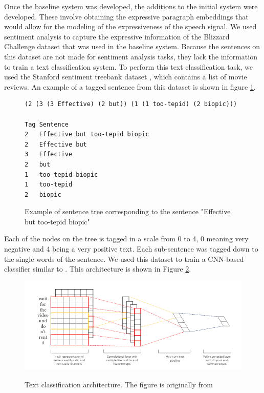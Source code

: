 Once the baseline system was developed, the additions to the initial system were developed. These involve obtaining the expressive paragraph embeddings that would allow for the modeling of the expressiveness of the speech signal. We used sentiment analysis to capture the expressive information of the Blizzard Challenge dataset that was used in the baseline system. Because the sentences on this dataset are not made for sentiment analysis tasks, they lack the information to train a text classification system. To perform this text classification task, we used the Stanford sentiment treebank dataset \cite{socher2013recursive}, which contains a list of movie reviews. An example of a tagged sentence from this dataset is shown in figure \ref{fig:tree}.

\begin{figure}[h]
    \begin{lstlisting}[basicstyle=\small,frame=single]
(2 (3 (3 Effective) (2 but)) (1 (1 too-tepid) (2 biopic)))

Tag Sentence
2   Effective but too-tepid biopic
2   Effective but
3   Effective
2   but
1   too-tepid biopic
1   too-tepid
2   biopic
    \end{lstlisting}
    \label{fig:tree}
    \caption{Example of sentence tree corresponding to the sentence "Effective but too-tepid biopic"}
\end{figure}

Each of the nodes on the tree is tagged in a scale from 0 to 4, 0 meaning very negative and 4 being a very positive text. Each sub-sentence was tagged down to the single words of the sentence. We used this dataset to train a CNN-based classifier similar to \cite{DBLP:journals/corr/Kim14f}. This architecture is shown in Figure \ref{fig:cnn-sa}.

\begin{figure}[h]
    \centering
    \includegraphics[width=15cm]{figures/cnn}
    \label{fig:cnn-sa}
    \caption{Text classification architecture. The figure is originally from \cite{DBLP:journals/corr/Kim14f}}
\end{figure}

